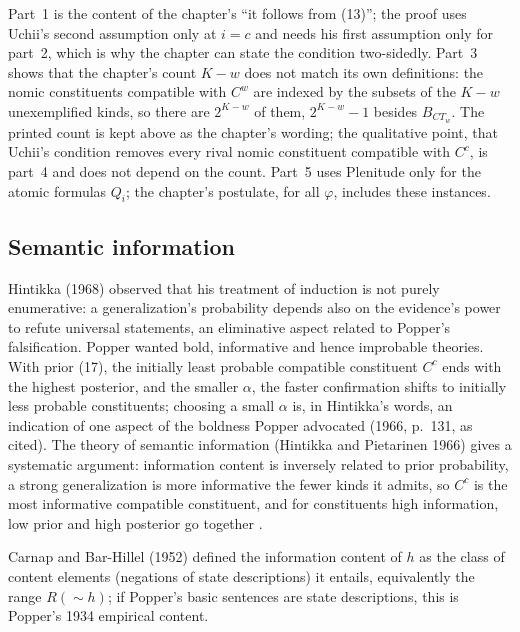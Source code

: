 Part~1 is the content of the chapter's ``it follows from (13)''; the
proof uses Uchii's second assumption only at \(i=c\) and needs his first
assumption only for part~2, which is why the chapter can state the
condition two-sidedly. Part~3 shows that the chapter's count \(K-w\) does
not match its own definitions: the nomic constituents compatible with
\(C^w\) are indexed by the subsets of the \(K-w\) unexemplified kinds, so
there are \(2^{K-w}\) of them, \(2^{K-w}-1\) besides \(B_{CT_w}\). The printed
count is kept above as the chapter's wording; the qualitative point, that
Uchii's condition removes every rival nomic constituent compatible with
\(C^c\), is part~4 and does not depend on the count. Part~5 uses Plenitude
only for the atomic formulas \(Q_i\); the chapter's postulate, for all
\(\varphi\), includes these instances.

\subsection{Semantic information}
\label{sec:p15-w02b-p15-030-nn-information}

Hintikka (1968) observed that his treatment of induction is not purely
enumerative: a generalization's probability depends also on the
evidence's power to refute universal statements, an eliminative aspect
related to Popper's falsification. Popper wanted bold, informative and
hence improbable theories. With prior (17), the initially least probable
compatible constituent \(C^c\) ends with the highest posterior, and the
smaller \(\alpha\), the faster confirmation shifts to initially less
probable constituents; choosing a small \(\alpha\) is, in Hintikka's
words, an indication of one aspect of the boldness Popper advocated (1966,
p.~131, as cited). The theory of semantic information (Hintikka and
Pietarinen 1966) gives a systematic argument: information content is
inversely related to prior probability, a strong generalization is more
informative the fewer kinds it admits, so \(C^c\) is the most informative
compatible constituent, and for constituents high information, low prior
and high posterior go together \cite[pp.~329--330]{Niiniluoto2011HintikkaProgramReading}.

Carnap and Bar-Hillel (1952) defined the information content of \(h\) as
the class of content elements (negations of state descriptions) it
entails, equivalently the range \(R(\sim h)\); if Popper's basic sentences
are state descriptions, this is Popper's 1934 empirical content.

